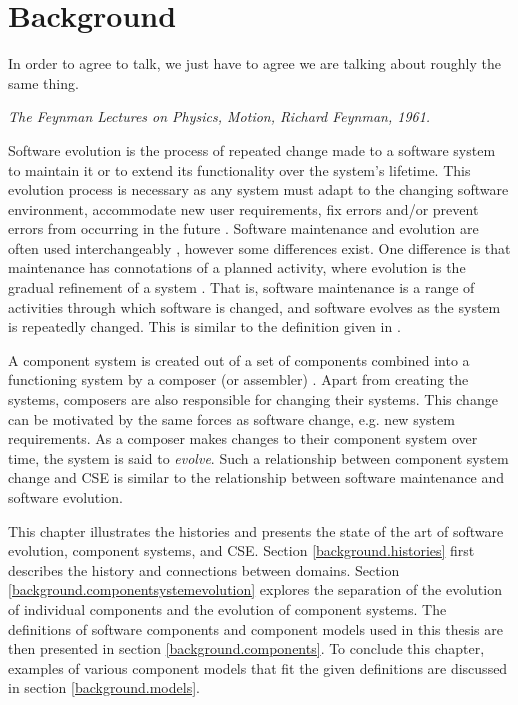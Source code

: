 \chapter{Background}
\label{background}
\epigraph{
In order to agree to talk, we just have to agree we are talking about roughly the same thing.
}
{\textit{The Feynman Lectures on Physics, Motion, Richard Feynman, 1961.}}

Software evolution \citep{lehman1980} is the process of repeated change made to a software system to maintain it or to extend its functionality over the system's lifetime.
This evolution process is necessary as any system must adapt to the changing software environment, accommodate new user requirements, 
fix errors and/or prevent errors from occurring in the future \citep{IsoIec2006}.
Software maintenance and evolution are often used interchangeably \citep{Godfrey2008}, however some differences exist.
One difference is that maintenance has connotations of a planned activity, where evolution is the gradual refinement of a system \citep{lehman1980}.
That is, software maintenance is a range of activities through which software is changed, and software evolves as the system is repeatedly changed.
This is similar to the definition given in \citep{lehman1980}.

A component system is created out of a set of components combined into a functioning system by a composer (or assembler) \citep{Szyperski2002}.
Apart from creating the systems, composers are also responsible for changing their systems.
This change can be motivated by the same forces as software change, e.g. new system requirements.   
As a composer makes changes to their component system over time, the system is said to \textit{evolve}.
Such a relationship between component system change and CSE is similar to the relationship between software maintenance and software evolution.

This chapter illustrates the histories and presents the state of the art of software evolution, component systems, and CSE.
Section \ref{background.histories} first describes the history and connections between domains. 
Section \ref{background.componentsystemevolution} explores the separation of the evolution of individual components and the evolution of component systems.
The definitions of software components and component models used in this thesis are then presented in section \ref{background.components}.
To conclude this chapter, examples of various component models that fit the given definitions are discussed in section \ref{background.models}.

